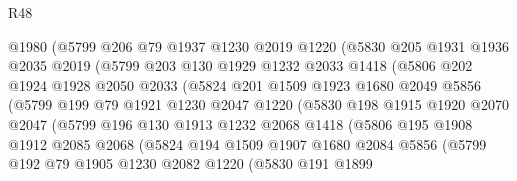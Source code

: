 \begin{lexlean}{R48}
\begin{coremodule}
                @1980
                (@5799
                  @206
                  @79
                  @1937
                  @1230
                  @2019
                  @1220
                  (@5830
                    @205
                    @1931
                    @1936
                    @2035
                    @2019
                    (@5799
                      @203
                      @130
                      @1929
                      @1232
                      @2033
                      @1418
                      (@5806
                        @202
                        @1924
                        @1928
                        @2050
                        @2033
                        (@5824
                          @201
                          @1509
                          @1923
                          @1680
                          @2049
                          @5856
                          (@5799
                            @199
                            @79
                            @1921
                            @1230
                            @2047
                            @1220
                            (@5830
                              @198
                              @1915
                              @1920
                              @2070
                              @2047
                              (@5799
                                @196
                                @130
                                @1913
                                @1232
                                @2068
                                @1418
                                (@5806
                                  @195
                                  @1908
                                  @1912
                                  @2085
                                  @2068
                                  (@5824
                                    @194
                                    @1509
                                    @1907
                                    @1680
                                    @2084
                                    @5856
                                    (@5799
                                      @192
                                      @79
                                      @1905
                                      @1230
                                      @2082
                                      @1220
                                      (@5830
                                        @191
                                        @1899

\end{coremodule}
\end{lexlean}
